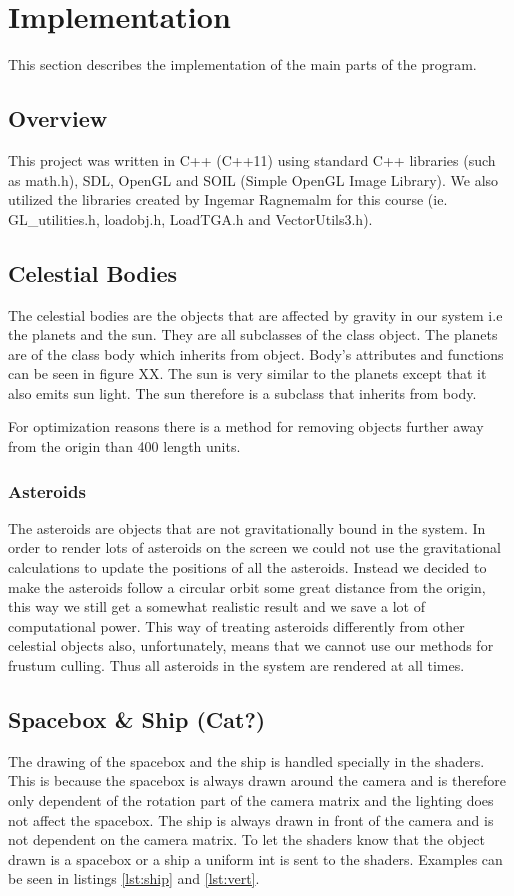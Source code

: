 \documentclass[a4paper,12pt]{article}
\begin{document}
\section{Implementation}
This section describes the implementation of the main parts of the program. 
\subsection{Overview}
This project was written in C++ (C++11) using standard C++ libraries (such as
math.h), SDL, OpenGL and SOIL (Simple OpenGL Image Library). We also utilized the libraries created
by Ingemar Ragnemalm for this course (ie. GL\_utilities.h, loadobj.h, LoadTGA.h
and VectorUtils3.h).
\subsection{Celestial Bodies}
The celestial bodies are the objects that are affected by gravity in our system
i.e the planets and the sun. They are all subclasses of the class object. The
planets are of the class body which inherits from object. Body's attributes and
functions can be seen in figure XX. The sun is very similar to the planets
except that it also emits sun light. The sun therefore is a subclass that
inherits from body. 

For optimization reasons there is a method for removing objects further away
from the origin than 400 length units.

\subsubsection{Asteroids}
The asteroids are objects that are not gravitationally bound in the system. In 
order to render lots of asteroids on the screen we could not use the
gravitational calculations to update the positions of all the asteroids. Instead
we decided to make the asteroids follow a circular orbit some great distance
from the origin, this way we still get a somewhat realistic result and we save a
lot of computational power. This way of treating asteroids differently from
other celestial objects also, unfortunately, means that we cannot use our
methods for frustum culling. Thus all asteroids in the system are rendered at
all times.

\subsection{Spacebox \& Ship (Cat?)}
The drawing of the spacebox and the ship is handled specially in the shaders.
This is because the spacebox is always drawn around the camera and is therefore
only dependent of the rotation part of the camera matrix and the lighting does
not affect the spacebox. The ship is always drawn in front of the camera and is
not dependent on the camera matrix. To let the shaders know that the object
drawn is a spacebox or a ship a uniform int is sent to the shaders. Examples
can be seen in listings \ref{lst:ship} and \ref{lst:vert}.
\end{document}
